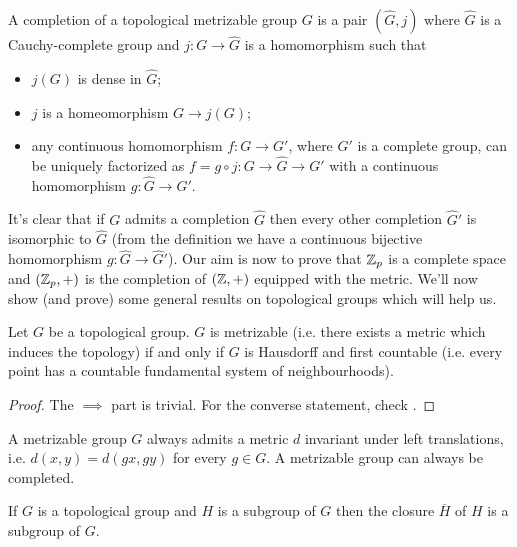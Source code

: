 		\begin{defn}
			A completion of a topological metrizable group $G$ is a pair $(\widehat{G}, j)$ where $\widehat{G}$ is a Cauchy-complete group and $j\colon G \to \widehat{G}$ is a homomorphism such that
			\begin{itemize}
				\item $j(G)$ is dense in $\widehat{G}$;
				\item $j$ is a homeomorphism $G \to j(G)$;
				\item any continuous homomorphism $f\colon G \to G'$, where $G'$ is a complete group, can be uniquely factorized as $f = g \circ j\colon  G \to \widehat{G} \to G'$ with a continuous homomorphism $g\colon \widehat{G} \to G'$.
			\end{itemize}
		\end{defn}
		It's clear that if $G$ admits a completion $\widehat{G}$ then every other completion $\widehat{G}'$ is isomorphic to $\widehat{G}$ (from the definition we have a continuous bijective homomorphism $g\colon \widehat{G} \to \widehat{G}'$).
		Our aim is now to prove that $\mathbb{Z}_p$ is a complete space and $(\mathbb{Z}_p, +)$ is the completion of $(\mathbb{Z}, +)$ equipped with the \padic metric. We'll now show (and prove) some general results on topological groups which will help us.
		\begin{lemma}
			Let $G$ be a topological group. $G$ is metrizable (i.e. there exists a metric which induces the topology) if and only if $G$ is Hausdorff and first countable (i.e. every point has a countable fundamental system of neighbourhoods).
		\end{lemma}
		\begin{proof}
			The $\implies$ part is trivial. For the converse statement, check \cite[Chap. \RN{11}]{bourbaki:topologie}.
		\end{proof}
		A metrizable group $G$ always admits a metric $d$ invariant under left translations, i.e. $d(x, y) = d(gx, gy)$ for every $g \in G$. A metrizable group can always be completed.
		\begin{lemma}
			\label{lemma:closure-group}
			If $G$ is a topological group and $H$ is a subgroup of $G$ then the closure $\overline{H}$ of $H$ is a subgroup of $G$. 
			\begin{comment}
			\begin{enumerate}[label=(\alph*)]
				\item the closure $\overline{H}$ of $H$ is a subgroup of $G$.
				\item $G$ is Hausdorff exactly when its neutral element is closed.
			\end{enumerate}
			\end{comment}
		\end{lemma}
